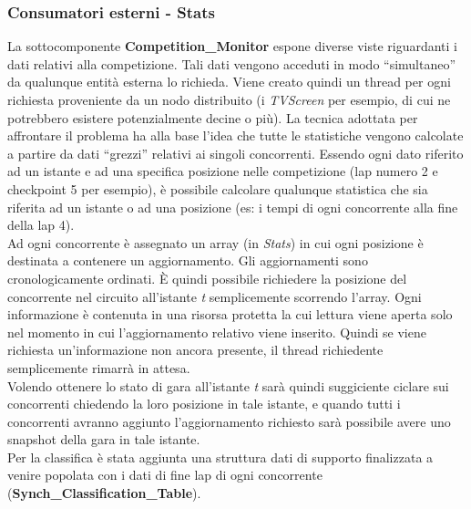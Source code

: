 \subsubsection{Consumatori esterni - Stats}
La sottocomponente \textbf{Competition\_Monitor} espone diverse viste riguardanti i dati relativi alla competizione. Tali dati vengono acceduti in modo ``simultaneo'' 
da qualunque entit\`{a} esterna lo richieda. Viene creato quindi un thread per ogni richiesta proveniente da un nodo distribuito (i \emph{TVScreen} per esempio, di cui
ne potrebbero esistere potenzialmente decine o pi\`{u}). La tecnica adottata
per affrontare il problema ha alla base l'idea che tutte le statistiche vengono calcolate a partire da dati ``grezzi'' relativi ai singoli concorrenti. Essendo ogni
dato riferito ad un istante e ad una specifica posizione nelle competizione (lap numero 2 e checkpoint 5 per esempio), \`{e} possibile calcolare qualunque statistica
che sia riferita ad un istante o ad una posizione (es: i tempi di ogni concorrente alla fine della lap 4).\\
Ad ogni concorrente \`{e} assegnato un array (in \emph{Stats}) in cui ogni posizione \`{e} destinata a contenere un aggiornamento. Gli aggiornamenti sono cronologicamente ordinati.
\`{E} quindi possibile richiedere la posizione del concorrente nel circuito all'istante \emph{t} semplicemente scorrendo l'array. Ogni informazione \`{e} contenuta in una risorsa
protetta la cui lettura viene aperta solo nel momento in cui l'aggiornamento relativo viene inserito. Quindi se viene richiesta un'informazione non ancora presente,
il thread richiedente semplicemente rimarr\`{a} in attesa.\\
Volendo ottenere lo stato di gara all'istante \emph{t} sar\`{a} quindi suggiciente ciclare sui concorrenti chiedendo la loro posizione in tale istante, e quando tutti i concorrenti
avranno aggiunto l'aggiornamento richiesto sar\`{a} possibile avere uno snapshot della gara in tale istante.\\
Per la classifica \`{e} stata aggiunta una struttura dati di supporto finalizzata a venire popolata con i dati di fine lap di ogni concorrente (\textbf{Synch\_Classification\_Table}).
